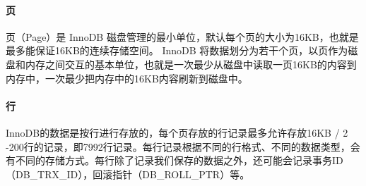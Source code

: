 \documentclass[../../../interview-questions.tex]{subfiles}
\begin{document}
\paragraph{页}

页（Page）是 InnoDB 磁盘管理的最小单位，默认每个页的大小为16KB，也就是最多能保证16KB的连续存储空间。
InnoDB 将数据划分为若干个页，以页作为磁盘和内存之间交互的基本单位，也就是一次最少从磁盘中读取一页16KB的内容到内存中，一次最少把内存中的16KB内容刷新到磁盘中。

\paragraph{行}

InnoDB的数据是按行进行存放的，每个页存放的行记录最多允许存放16KB / 2 -200行的记录，即7992行记录。每行记录根据不同的行格式、不同的数据类型，会有不同的存储方式。每行除了记录我们保存的数据之外，还可能会记录事务ID（DB\_TRX\_ID），回滚指针（DB\_ROLL\_PTR）等。
\end{document}
